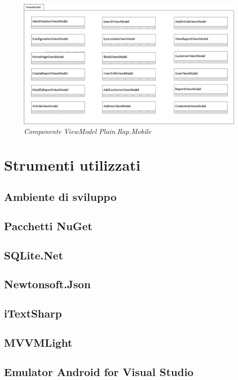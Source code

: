 		\begin{figure}[ht]
			\centering
			\includegraphics[scale=0.35]{immagini/progettazione/plainrap_viewmodel.jpg}
			\caption{\textit{Componente ViewModel Plain.Rap.Mobile}}
		\end{figure}\FloatBarrier

\section{Strumenti utilizzati}
\subsection{Ambiente di sviluppo}
\subsection{Pacchetti NuGet}
\subsection{SQLite.Net}
\subsection{Newtonsoft.Json}
\subsection{iTextSharp}
\subsection{MVVMLight}
\subsection{Emulator Android for Visual Studio}


